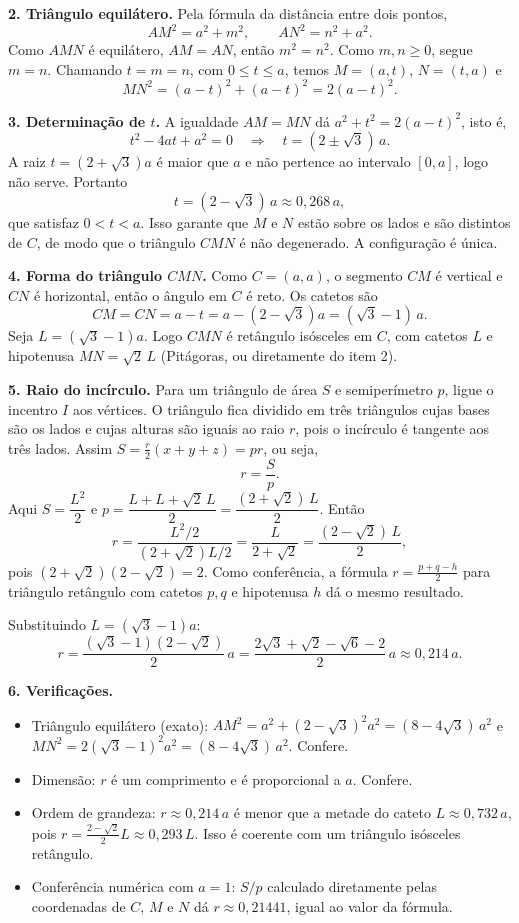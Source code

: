 \documentclass{article}%
\begin{document}
\textbf{2. Triângulo equilátero.} Pela fórmula da distância entre dois pontos,
\[
AM^2=a^2+m^2, \qquad AN^2=n^2+a^2 .
\]
Como $AMN$ é equilátero, $AM=AN$, então $m^2=n^2$. Como $m,n\ge 0$, segue $m=n$. Chamando $t=m=n$, com $0\le t\le a$, temos $M=(a,t)$, $N=(t,a)$ e
\[
MN^2=(a-t)^2+(a-t)^2=2(a-t)^2 .
\]

\textbf{3. Determinação de $t$.} A igualdade $AM=MN$ dá $a^2+t^2=2(a-t)^2$, isto é,
\[
t^2-4at+a^2=0 \quad\Rightarrow\quad t=(2\pm\sqrt{3})\,a .
\]
A raiz $t=(2+\sqrt{3})a$ é maior que $a$ e não pertence ao intervalo $[0,a]$, logo não serve. Portanto
\[
t=(2-\sqrt{3})\,a \approx 0{,}268\,a ,
\]
que satisfaz $0<t<a$. Isso garante que $M$ e $N$ estão sobre os lados e são distintos de $C$, de modo que o triângulo $CMN$ é não degenerado. A configuração é única.

\textbf{4. Forma do triângulo $CMN$.} Como $C=(a,a)$, o segmento $CM$ é vertical e $CN$ é horizontal, então o ângulo em $C$ é reto. Os catetos são
\[
CM=CN=a-t=a-(2-\sqrt{3})a=(\sqrt{3}-1)\,a .
\]
Seja $L=(\sqrt{3}-1)a$. Logo $CMN$ é retângulo isósceles em $C$, com catetos $L$ e hipotenusa $MN=\sqrt{2}\,L$ (Pitágoras, ou diretamente do item 2).

\textbf{5. Raio do incírculo.} Para um triângulo de área $S$ e semiperímetro $p$, ligue o incentro $I$ aos vértices. O triângulo fica dividido em três triângulos cujas bases são os lados e cujas alturas são iguais ao raio $r$, pois o incírculo é tangente aos três lados. Assim $S=\frac{r}{2}(x+y+z)=pr$, ou seja,
\[
r=\frac{S}{p}.
\]
Aqui $S=\dfrac{L^2}{2}$ e $p=\dfrac{L+L+\sqrt{2}\,L}{2}=\dfrac{(2+\sqrt{2})\,L}{2}$. Então
\[
r=\frac{L^2/2}{(2+\sqrt{2})L/2}=\frac{L}{2+\sqrt{2}}=\frac{(2-\sqrt{2})\,L}{2},
\]
pois $(2+\sqrt{2})(2-\sqrt{2})=2$. Como conferência, a fórmula $r=\frac{p+q-h}{2}$ para triângulo retângulo com catetos $p,q$ e hipotenusa $h$ dá o mesmo resultado.

Substituindo $L=(\sqrt{3}-1)a$:
\[
r=\frac{(\sqrt{3}-1)(2-\sqrt{2})}{2}\,a=\frac{2\sqrt{3}+\sqrt{2}-\sqrt{6}-2}{2}\,a\approx 0{,}214\,a .
\]

\textbf{6. Verificações.}
\begin{itemize}
\item Triângulo equilátero (exato): $AM^2=a^2+(2-\sqrt{3})^2a^2=(8-4\sqrt{3})\,a^2$ e $MN^2=2(\sqrt{3}-1)^2a^2=(8-4\sqrt{3})\,a^2$. Confere.
\item Dimensão: $r$ é um comprimento e é proporcional a $a$. Confere.
\item Ordem de grandeza: $r\approx 0{,}214\,a$ é menor que a metade do cateto $L\approx 0{,}732\,a$, pois $r=\frac{2-\sqrt{2}}{2}L\approx 0{,}293\,L$. Isso é coerente com um triângulo isósceles retângulo.
\item Conferência numérica com $a=1$: $S/p$ calculado diretamente pelas coordenadas de $C$, $M$ e $N$ dá $r\approx 0{,}21441$, igual ao valor da fórmula.
\end{itemize}
\end{document}
